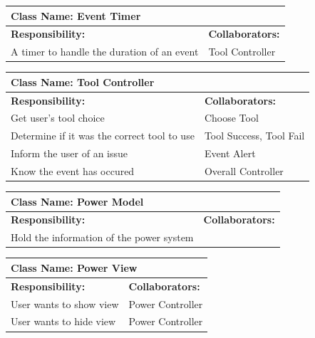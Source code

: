 \documentclass[12pt, titlepage]{article}
\begin{document}
\begin{enumerate}[a)]
	\begin{table}[H]
		\centering
		\begin{tabular}{|p{10cm}|p{5cm}|}
		\hline 
		 \multicolumn{2}{|l|}{\textbf{Class Name: Event Timer}} \\
		\hline
		\textbf{Responsibility:} & \textbf{Collaborators:} \\
		\hline
		 A timer to handle the duration of an event & Tool Controller\\
		\hline
		\end{tabular}
	\end{table}

	\begin{table}[H]
		\centering
		\begin{tabular}{|p{10cm}|p{5cm}|}
		\hline 
		 \multicolumn{2}{|l|}{\textbf{Class Name: Tool Controller}} \\
		\hline
		\textbf{Responsibility:} & \textbf{Collaborators:} \\
		\hline
		 Get user's tool choice & Choose Tool\\
		\hline
		 Determine if it was the correct tool to use & Tool Success, Tool Fail \\
		\hline
		 Inform the user of an issue & Event Alert \\
		\hline
		 Know the event has occured & Overall Controller \\
		\hline
		\end{tabular}
	\end{table}

	\begin{table}[H]
		\centering
		\begin{tabular}{|p{10cm}|p{5cm}|}
		\hline 
		 \multicolumn{2}{|l|}{\textbf{Class Name: Power Model}} \\
		\hline
		\textbf{Responsibility:} & \textbf{Collaborators:} \\
		\hline
		 Hold the information of the power system & \\
		\hline
		\end{tabular}
	\end{table}

	\begin{table}[H]
		\centering
		\begin{tabular}{|p{10cm}|p{5cm}|}
		\hline 
		 \multicolumn{2}{|l|}{\textbf{Class Name: Power View}} \\
		\hline
		\textbf{Responsibility:} & \textbf{Collaborators:} \\
		\hline
		 User wants to show view & Power Controller\\
		\hline
		User wants to hide view & Power Controller\\
		\hline
		\end{tabular}
	\end{table}


\end{enumerate}
\end{document}
